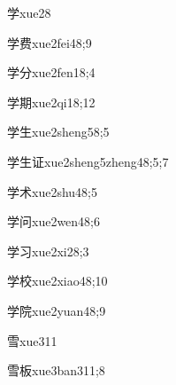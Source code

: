 \begin{verbete}{学}{xue2}{8}
\end{verbete}

\begin{verbete}{学费}{xue2fei4}{8;9}
\end{verbete}

\begin{verbete}{学分}{xue2fen1}{8;4}
\end{verbete}

\begin{verbete}{学期}{xue2qi1}{8;12}
\end{verbete}

\begin{verbete}{学生}{xue2sheng5}{8;5}
\end{verbete}

\begin{verbete}{学生证}{xue2sheng5zheng4}{8;5;7}
\end{verbete}

\begin{verbete}{学术}{xue2shu4}{8;5}
\end{verbete}

\begin{verbete}{学问}{xue2wen4}{8;6}
\end{verbete}

\begin{verbete}{学习}{xue2xi2}{8;3}
\end{verbete}

\begin{verbete}{学校}{xue2xiao4}{8;10}
\end{verbete}

\begin{verbete}{学院}{xue2yuan4}{8;9}
\end{verbete}

\begin{verbete}{雪}{xue3}{11}
\end{verbete}

\begin{verbete}{雪板}{xue3ban3}{11;8}
\end{verbete}

